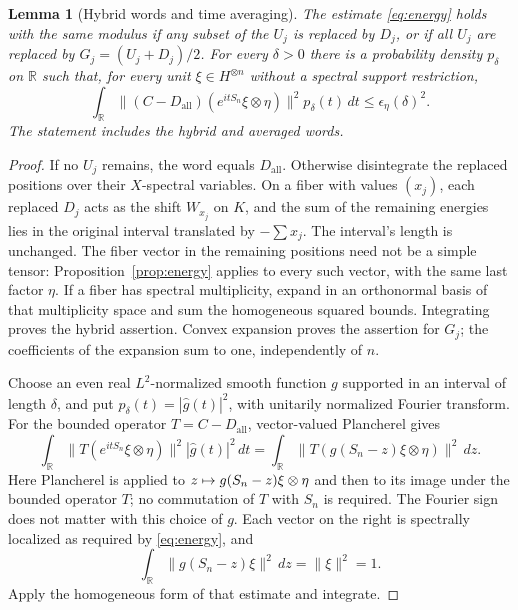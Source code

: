 \documentclass[11pt]{article}
\let\originalmapsto\mapsto
\renewcommand{\mapsto}{\mathrel{\pdfliteral direct{/Span << /ActualText <FEFF21A6> >> BDC}\originalmapsto\pdfliteral direct{EMC}}}
\newtheorem{lemma}[theorem]{Lemma}
\theoremstyle{definition}
\newcommand{\R}{\mathbb R}
\begin{document}
\begin{lemma}[Hybrid words and time averaging]\label{lem:hybrid}
The estimate \eqref{eq:energy} holds with the same modulus if any subset of
the $U_j$ is replaced by $D_j$, or if all $U_j$ are replaced by
$G_j=(U_j+D_j)/2$.
For every $\delta>0$ there is a probability density $p_\delta$ on $\R$ such
that, for every unit $\xi\in H^{\otimes n}$ without a spectral support
restriction,
\begin{equation}\label{eq:timeavg}
 \int_\R\|(C-D_{\mathrm{all}})(e^{itS_n}\xi\otimes\eta)\|^2
       p_\delta(t)\,dt\le\epsilon_\eta(\delta)^2.
\end{equation}
The statement includes the hybrid and averaged words.
\end{lemma}
\begin{proof}
If no $U_j$ remains, the word equals $D_{\mathrm{all}}$. Otherwise
disintegrate the replaced positions over their $X$-spectral variables.
On a fiber with values $(x_j)$, each replaced $D_j$ acts as the shift
$W_{x_j}$ on $K$, and the sum of the remaining energies lies in the
original interval translated by $-\sum x_j$. The interval's length is
unchanged. The fiber vector in the remaining positions need not be a
simple tensor: Proposition~\ref{prop:energy} applies to every such vector,
with the same last factor $\eta$. If a fiber has spectral multiplicity,
expand in an orthonormal basis of that multiplicity space and sum the
homogeneous squared bounds. Integrating proves the hybrid assertion. Convex
expansion proves the assertion for $G_j$; the coefficients of the expansion
sum to one, independently of $n$.

Choose an even real $L^2$-normalized smooth function $g$ supported in an
interval of length $\delta$, and put $p_\delta(t)=|\widehat g(t)|^2$, with
unitarily normalized Fourier transform. For the bounded operator
$T=C-D_{\mathrm{all}}$, vector-valued Plancherel gives
\[
 \int_\R\|T(e^{itS_n}\xi\otimes\eta)\|^2|\widehat g(t)|^2\,dt
 =\int_\R\|T(g(S_n-z)\xi\otimes\eta)\|^2\,dz.
\]
Here Plancherel is applied to $z\mapsto g(S_n-z)\xi\otimes\eta$ and then
to its image under the bounded operator $T$; no commutation of $T$ with
$S_n$ is required. The Fourier sign does not matter with this choice of $g$.
Each vector on
the right is spectrally localized as required by \eqref{eq:energy}, and
\[
 \int_\R\|g(S_n-z)\xi\|^2\,dz=\|\xi\|^2=1.
\]
Apply the homogeneous form of that estimate and integrate.
\end{proof}
\end{document}
